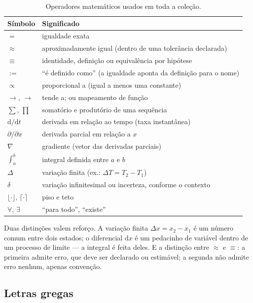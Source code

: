 \documentclass[12pt,a4paper]{article}
\numberwithin{equation}{section}
\numberwithin{table}{section}
\numberwithin{figure}{section}
\begin{document}
\begin{table}[H]
\centering
\caption[Operadores matemáticos e seu significado.]{%
Operadores matemáticos usados em toda a coleção.}
\label{tab:v0-c2-1}
\begin{tabularx}{\textwidth}{lX}
\toprule
\textbf{Símbolo} & \textbf{Significado} \\
\midrule
$=$ & igualdade exata \\
$\approx$ & aproximadamente igual (dentro de uma tolerância declarada) \\
$\equiv$ & identidade, definição ou equivalência por hipótese \\
$:= $ & ``é definido como'' (a igualdade aponta da definição para o nome) \\
$\propto$ & proporcional a (igual a menos uma constante) \\
$\rightarrow$, $\to$ & tende a; ou mapeamento de função \\
$\sum$, $\prod$ & somatório e produtório de uma sequência \\
$\mathrm{d}/\mathrm{d}t$ & derivada em relação ao tempo (taxa instantânea) \\
$\partial/\partial x$ & derivada parcial em relação a $x$ \\
$\nabla$ & gradiente (vetor das derivadas parciais) \\
$\int_a^b$ & integral definida entre $a$ e $b$ \\
$\Delta$ & variação finita (ex.: $\Delta T = T_2 - T_1$) \\
$\delta$ & variação infinitesimal ou incerteza, conforme o contexto \\
$\lfloor\cdot\rfloor$, $\lceil\cdot\rceil$ & piso e teto \\
$\forall$, $\exists$ & ``para todo'', ``existe'' \\
\bottomrule
\end{tabularx}
\end{table}

Duas distinções valem reforço. A variação finita $\Delta x = x_2 - x_1$ é um
número comum entre dois estados; o diferencial $\mathrm{d}x$ é um pedacinho
de variável dentro de um processo de limite --- a integral é feita deles. E
a distinção entre $\approx$ e $\equiv$: a primeira admite erro, que deve ser
declarado ou estimável; a segunda não admite erro nenhum, apenas convenção.

\subsection{Letras gregas}
\end{document}
